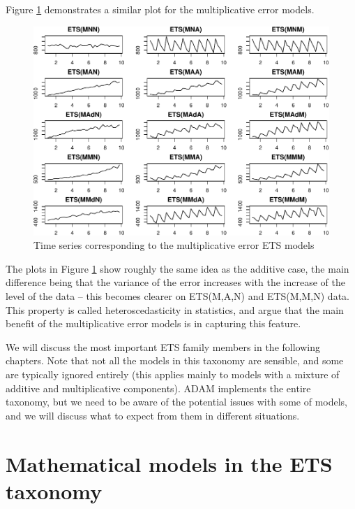 \documentclass[]{book}
\theoremstyle{definition}
\theoremstyle{definition}
\theoremstyle{definition}
\theoremstyle{definition}
\theoremstyle{remark}
\begin{document}
Figure \ref{fig:ETSTaxonomyMultiplicative} demonstrates a similar plot for the multiplicative error models.

\begin{figure}
\centering
\includegraphics{Svetunkov--2022----ADAM_files/figure-latex/ETSTaxonomyMultiplicative-1.pdf}
\caption{\label{fig:ETSTaxonomyMultiplicative}Time series corresponding to the multiplicative error ETS models}
\end{figure}

The plots in Figure \ref{fig:ETSTaxonomyMultiplicative} show roughly the same idea as the additive case, the main difference being that the variance of the error increases with the increase of the level of the data -- this becomes clearer on ETS(M,A,N) and ETS(M,M,N) data. This property is called heteroscedasticity in statistics, and \citet{Hyndman2008b} argue that the main benefit of the multiplicative error models is in capturing this feature.

We will discuss the most important ETS family members in the following chapters. Note that not all the models in this taxonomy are sensible, and some are typically ignored entirely (this applies mainly to models with a mixture of additive and multiplicative components). ADAM implements the entire taxonomy, but we need to be aware of the potential issues with some of models, and we will discuss what to expect from them in different situations.

\hypertarget{ETSTaxonomyMaths}{%
\section{Mathematical models in the ETS taxonomy}\label{ETSTaxonomyMaths}}
\end{document}
